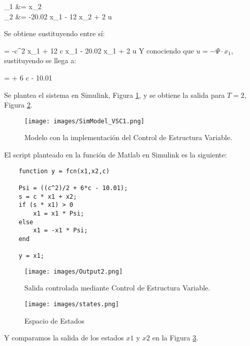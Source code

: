 \documentclass[a4paper, fontsize=11pt]{scrartcl} %
\numberwithin{equation}{section} %
\numberwithin{figure}{section} %
\numberwithin{table}{section} %
\newenvironment{myalign}{\par\nobreak\large\noindent\align}{\endalign} %
\begin{document}
	\begin{myalign}
		\begin{split}
			_1 &= x_2 \\
			_2 &= -20.02 \cdot x_1 - 12 \cdot x_2 + 2 \cdot u
		\end{split}
	\end{myalign}
	Se obtiene sustituyendo entre sí:
	
	\begin{myalign}
		 = -c^2 \cdot x_1 + 12 \cdot c \cdot x_1 - 20.02 \cdot x_1 + 2 \cdot u
	\end{myalign}
	Y conociendo que $u = - \Psi \cdot x_1$, sustituyendo se llega a:
	
	\begin{myalign}
		\Psi =  + 6 \cdot c - 10.01
	\end{myalign}
	
	Se plantea el sistema en Simulink, Figura \ref{VSC2}, y se obtiene la salida para $T = 2$, Figura \ref{Output2}.\\
	
	\begin{figure}[h!]
		\centering
		\texttt{[image: images/SimModel\_VSC1.png]}
		\caption{Modelo con la implementación del Control de Estructura Variable.}
		\label{VSC2}
	\end{figure}
	\FloatBarrier
	
	El script planteado en la función de Matlab en Simulink es la siguiente:
	
	\begin{lstlisting}
	function y = fcn(x1,x2,c)
	
	Psi = ((c^2)/2 + 6*c - 10.01);
	s = c * x1 + x2;
	if (s * x1) > 0
		x1 = x1 * Psi;
	else
		x1 = -x1 * Psi;
	end
	
	y = x1;
	\end{lstlisting}
		
	\begin{figure}[h!]
		\centering
		\texttt{[image: images/Output2.png]}
		\caption{Salida controlada mediante Control de Estructura Variable.}
		\label{Output2}
	\end{figure}
	\FloatBarrier
	
	\begin{figure}[h!]
		\centering
		\texttt{[image: images/states.png]}
		\caption{Espacio de Estados}
		\label{States}
	\end{figure}
	\FloatBarrier
	Y comparamos la salida de los estados $x1$ y $x2$ en la Figura \ref{States}.
	
\end{document}
